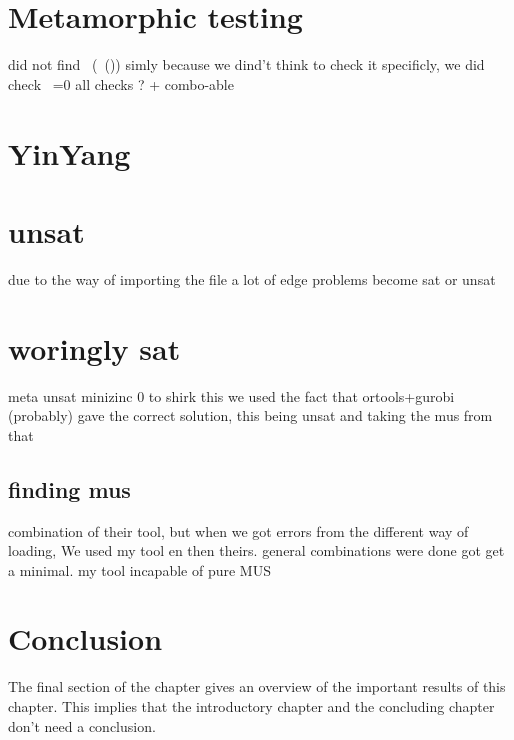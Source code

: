 \section{Metamorphic testing}
did not find ~(~()) simly because we dind't think to check it specificly, we did check ~=0
all checks ? + combo-able

\section{YinYang}


\section{unsat}
due to the way of importing the file a lot of edge problems become sat or unsat

\section{woringly sat}
meta unsat minizinc 0
to shirk this we used the fact that ortools+gurobi (probably) gave the correct solution, this being unsat and taking the mus from that


\subsection{finding mus}
combination of their tool, but when we got errors from the different way of loading, We used my tool en then theirs. general combinations were done got get a minimal. 
my tool incapable of pure MUS





\section{Conclusion}
The final section of the chapter gives an overview of the important results
of this chapter. This implies that the introductory chapter and the
concluding chapter don't need a conclusion.

